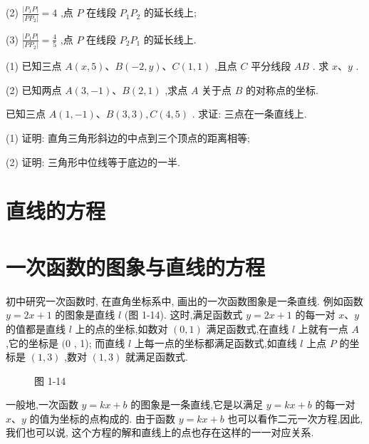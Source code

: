 \documentclass[lang=cn,newtx,12pt,scheme=chinese]{elegantbook}
\begin{document}
\begin{problemset}[习 题 一]
(2) \(\frac{\left| {P}_{1}P\right| }{\left| P{P}_{2}\right| } = 4\) ,点 \(P\) 在线段 \({P}_{1}{P}_{2}\) 的延长线上;

(3) \(\frac{\left| {P}_{1}P\right| }{\left| P{P}_{2}\right| } = \frac{4}{5}\) ,点 \(P\) 在线段 \({P}_{2}{P}_{1}\) 的延长线上.

\item (1) 已知三点 \(A\left( {x,5}\right) \text{、}B\left( {-2,y}\right) \text{、}C\left( {1,1}\right)\) ,且点 \(C\) 平分线段 \({AB}\) . 求 \(x\text{、}y\) .

(2) 已知两点 \(A\left( {3, - 1}\right) \text{、}B\left( {2,1}\right)\) ,求点 \(A\) 关于点 \(B\) 的对称点的坐标.

\item 已知三点 \(A\left( {1, - 1}\right) \text{、}B\left( {3,3}\right) ,C\left( {4,5}\right)\) . 求证: 三点在一条直线上.

\item (1) 证明: 直角三角形斜边的中点到三个顶点的距离相等;

(2) 证明: 三角形中位线等于底边的一半.
\end{problemset}

\section*{直线的方程}

\section{一次函数的图象与直线的方程}

初中研究一次函数时, 在直角坐标系中, 画出的一次函数图象是一条直线. 例如函数 \(y = {2x} + 1\) 的图象是直线 \(l\) (图 1-14). 这时,满足函数式 \(y = {2x} + 1\) 的每一对 \(x\text{、}y\) 的值都是直线 \(l\) 上的点的坐标,如数对 \(\left( {0,1}\right)\) 满足函数式,在直线 \(l\) 上就有一点 \(A\) ,它的坐标是 \((0\) , 1); 而直线 \(l\) 上每一点的坐标都满足函数式,如直线 \(l\) 上点 \(P\) 的坐标是 \(\left( {1,3}\right)\) ,数对 \(\left( {1,3}\right)\) 就满足函数式.

\begin{figure}[h]
  \centering
  
  \caption{图 1-14}
\end{figure}

一般地,一次函数 \(y = {kx} + b\) 的图象是一条直线,它是以满足 \(y = {kx} + b\) 的每一对 \(x\text{、}y\) 的值为坐标的点构成的. 由于函数 \(y = {kx} + b\) 也可以看作二元一次方程,因此,我们也可以说, 这个方程的解和直线上的点也存在这样的一一对应关系.
\end{document}
